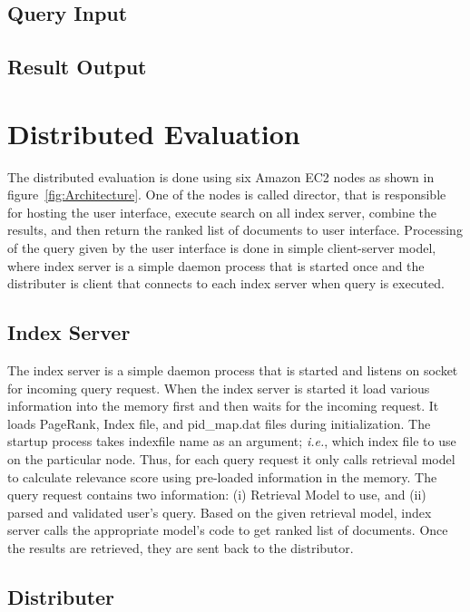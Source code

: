 \documentclass[letterpaper,11pt,twoside]{article}
\begin{document}
\subsection{Query Input}

\subsection{Result Output}

\section{Distributed Evaluation}

The distributed evaluation is done using six Amazon EC2 nodes as shown in figure~\ref{fig:Architecture}. One of the nodes is called director, that is responsible for hosting the user interface, execute search on all index server, combine the results, and then return the ranked list of documents to user interface. Processing of the query given by the user interface is done in simple client-server model, where index server is a simple daemon process that is started once and the distributer is client that connects to each index server when query is executed.

\subsection{Index Server}

The index server is a simple daemon process that is started and listens on socket for incoming query request. When the index server is started it load various information into the memory first and then waits for the incoming request. It loads PageRank, Index file, and pid\_map.dat files during initialization. The startup process takes indexfile name as an argument; \emph{i.e.}, which index file to use on the particular node. Thus, for each query request it only calls retrieval model to calculate relevance score using pre-loaded information in the memory. The query request contains two information: (i) Retrieval Model to use, and (ii) parsed and validated user's query. Based on the given retrieval model, index server calls the appropriate model's code to get ranked list of documents. Once the results are retrieved, they are sent back to the distributor. 

\subsection{Distributer}
\end{document}
